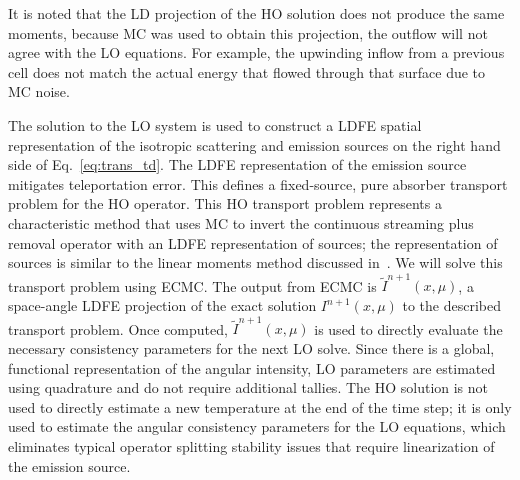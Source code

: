 It is noted that the LD projection of the HO solution does not produce the same moments, because
MC was used to obtain this projection, the outflow will not agree with the LO equations.
For example, the upwinding inflow from a previous cell does not match the actual energy
that flowed through that surface due to MC noise.

The solution to the LO system is used to construct a LDFE spatial representation of
the isotropic scattering and emission sources on the right hand side of
Eq.~\eqref{eq:trans_td}.   The LDFE representation of the emission source mitigates teleportation error.
 This defines a fixed-source, pure absorber
transport problem for the HO operator. This HO transport problem represents a characteristic method that uses MC to
invert the continuous streaming plus removal operator with an LDFE representation of
sources; the representation of sources is similar to the linear moments method
discussed in~\cite{larsen_error}.  We will solve this transport problem using ECMC.  The output from ECMC is
$\tilde{I}^{n+1}(x,\mu)$, a space-angle LDFE projection of the exact solution
$I^{n+1}(x,\mu)$ to the described transport problem.  Once computed, $\tilde{I}^{n+1}(x,\mu)$ is used
to directly evaluate the necessary consistency parameters for the next LO solve.  Since there is a global, functional representation of
the angular intensity,  LO parameters are estimated using quadrature and do not
require additional tallies.  The HO solution is not used to directly estimate a new
temperature at the end of the time step; it is
only used to estimate the angular consistency parameters for the LO equations, which eliminates
typical operator splitting stability issues that require linearization of the emission source.

